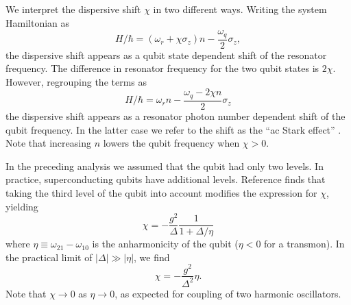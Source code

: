 We interpret the dispersive shift $\chi$ in two different ways.
Writing the system Hamiltonian as \begin{equation}
H/\hbar = \left( \omega_r + \chi \sigma_z \right) n - \frac{\omega_q}{2}\sigma_z , \end{equation}
the dispersive shift appears as a qubit state dependent shift of the resonator frequency.
The difference in resonator frequency for the two qubit states is $2\chi$.
However, regrouping the terms as \begin{equation}
H/\hbar = \omega_r n - \frac{\omega_q - 2 \chi n}{2} \sigma_z \label{eq:sec:dispersiveHamiltonian:acStark} \end{equation}
the dispersive shift appears as a resonator photon number dependent shift of the qubit frequency.
In the latter case we refer to the shift as the ``ac Stark effect'' \cite{Wallraff:2004, Schuster:acStarkDephasing2005}.
Note that increasing $n$ lowers the qubit frequency when $\chi >0$.

In the preceding analysis we assumed that the qubit had only two levels.
In practice, superconducting qubits have additional levels.
Reference \cite{Koch:transmon2007} finds that taking the third level of the qubit into account modifies the expression for $\chi$, yielding \begin{equation}
\chi = -\frac{g^2}{\Delta} \frac{1}{1 + \Delta/\eta} \label{eq:dispersiveHamiltonianChi} \end{equation}
where $\eta \equiv \omega_{21} - \omega_{10}$ is the anharmonicity of the qubit ($\eta < 0$ for a transmon).
In the practical limit of $\left| \Delta \right| \gg \left| \eta \right|$, we find \begin{equation}
\chi = -\frac{g^2}{\Delta^2} \eta . \end{equation}
Note that $\chi \rightarrow 0$ as $\eta \rightarrow 0$, as expected for coupling of two harmonic oscillators.
